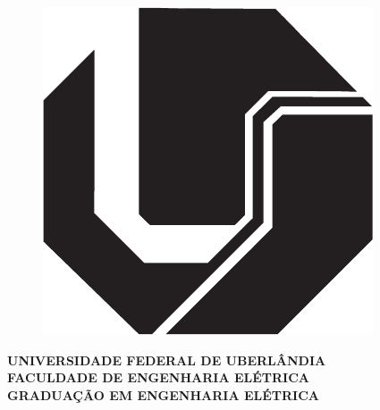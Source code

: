 

\thispagestyle{empty}                                               %

\begin{center}

\begin{figure}[h]
\begin{center}
{\includegraphics[scale = 0.4]{img/logo_ufu}}
\end{center}
\end{figure}

\bf{\large{UNIVERSIDADE FEDERAL DE UBERLÂNDIA}} \\
\bf{\large{FACULDADE DE ENGENHARIA ELÉTRICA}} \\
\bf{\large{GRADUAÇÃO EM ENGENHARIA ELÉTRICA}}\\
\vfill
\bf \large{\disc} \par
\large{\prof}
\vfill
\bf \large{\@titulo} \par
\vfill
\large{\@author} \par
\large{\id} \par
\vfill
\@city \\ \@year
\end{center}
